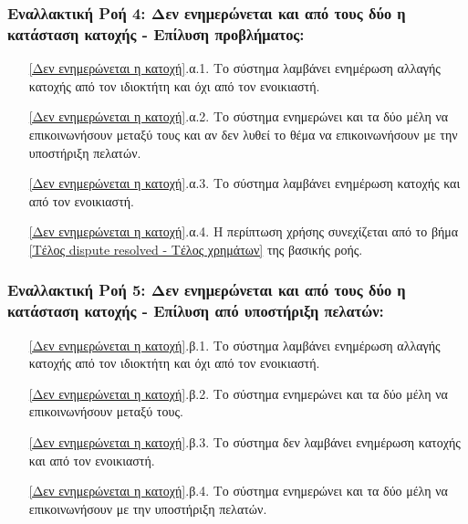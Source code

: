 \documentclass[12pt,a4paper]{article}
\begin{document}
\subsubsection*{Εναλλακτική Ροή 4: Δεν ενημερώνεται και από τους δύο η κατάσταση κατοχής - Επίλυση προβλήματος:}
\begin{enumerate}
    \item[\ref{Δεν ενημερώνεται η κατοχή}.α.1.] Το σύστημα λαμβάνει ενημέρωση αλλαγής κατοχής από τον ιδιοκτήτη και όχι από τον ενοικιαστή.
    \item[\ref{Δεν ενημερώνεται η κατοχή}.α.2.] Το σύστημα ενημερώνει και τα δύο μέλη να επικοινωνήσουν μεταξύ τους και αν δεν λυθεί το θέμα να επικοινωνήσουν με την υποστήριξη πελατών.
    \item[\ref{Δεν ενημερώνεται η κατοχή}.α.3.] Το σύστημα λαμβάνει ενημέρωση κατοχής και από τον ενοικιαστή.
    \item[\ref{Δεν ενημερώνεται η κατοχή}.α.4.] Η περίπτωση χρήσης συνεχίζεται από το βήμα \ref{Τέλος dispute resolved - Τέλος χρημάτων} της βασικής ροής.
\end{enumerate}

\subsubsection*{Εναλλακτική Ροή 5: Δεν ενημερώνεται και από τους δύο η κατάσταση κατοχής - Επίλυση από υποστήριξη πελατών:}
\begin{enumerate}
    \item[\ref{Δεν ενημερώνεται η κατοχή}.β.1.] Το σύστημα λαμβάνει ενημέρωση αλλαγής κατοχής από τον ιδιοκτήτη και όχι από τον ενοικιαστή.
    \item[\ref{Δεν ενημερώνεται η κατοχή}.β.2.] Το σύστημα ενημερώνει και τα δύο μέλη να επικοινωνήσουν μεταξύ τους.
    \item[\ref{Δεν ενημερώνεται η κατοχή}.β.3.] Το σύστημα δεν λαμβάνει ενημέρωση κατοχής και από τον ενοικιαστή.
    \item[\ref{Δεν ενημερώνεται η κατοχή}.β.4.] Το σύστημα ενημερώνει και τα δύο μέλη να επικοινωνήσουν με την υποστήριξη πελατών.
\end{enumerate}
\end{document}
